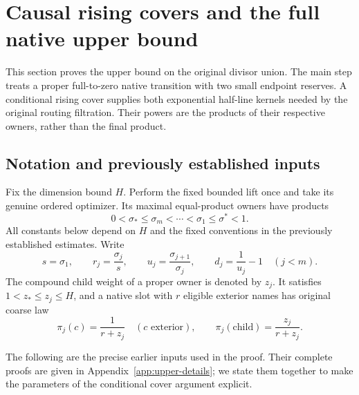 
\section{Causal rising covers and the full native upper bound}
\label{upper:section}

This section proves the upper bound on the original divisor union.
The main step treats a proper full-to-zero native transition with two
small endpoint reserves.  A conditional rising cover supplies both exponential half-line kernels
needed by the original routing filtration.  Their powers are the
products of their respective owners, rather than the final product.

\subsection{Notation and previously established inputs}
\label{upper:inputs-section}

Fix the dimension bound $H$.  Perform the fixed bounded lift once and
take its genuine ordered optimizer.  Its maximal equal-product owners
have products
\[
  0<\sigma_*\leq \sigma_m<\cdots<\sigma_1\leq\sigma^*<1.
\]
All constants below depend on $H$ and the fixed conventions in the
previously established estimates.  Write
\begin{equation}
 s=\sigma_1,\qquad r_j=\frac{\sigma_j}{s},\qquad
 u_j=\frac{\sigma_{j+1}}{\sigma_j},\qquad
 d_j=\frac1{u_j}-1\quad(j<m).
 \label{upper:ratios}
\end{equation}
The compound child weight of a proper owner is denoted by $z_j$.
It satisfies $1<z_*\leq z_j\leq H$, and a native slot with $r$
eligible exterior names has original coarse law
\begin{equation}
 \pi_j(c)=\frac1{r+z_j}\quad(c\text{ exterior}),\qquad
 \pi_j(\mathrm{child})=\frac{z_j}{r+z_j}.
 \label{upper:native-law}
\end{equation}

The following are the precise earlier inputs used in the proof.
Their complete proofs are given in Appendix~\ref{app:upper-details};
we state them together to make the parameters of the conditional
cover argument explicit.

